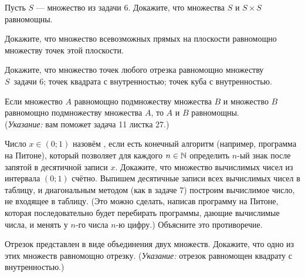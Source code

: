 \documentclass[a4paper,12pt]{article}
\begin{document}
Пусть $S$ --- множество из задачи 6. Докажите, что
множества $S$ и $S\times S$ равномощны.

Докажите, что множество всевозможных
прямых на %
плоскости
равномощно множеству точек этой плоскости.


Докажите, что множество точек любого отрезка %
равномощно множеству\\
$S$~зада\-чи 6;
%
точек квадрата с внутренностью; %
точек куба с внутренностью.



Если множество $A$ равномощно %
подмножеству множества $B$ и множество $B$ равномощно %
подмножеству множества $A$, то %
$A$ и $B$ равномощны. \\
{\footnotesize({\em Указание:} вам поможет задача 11 листка 27.)}


Число $x\in(0;1)$ назовём , если есть
конечный алгоритм (например, программа на Питоне), который позволяет для каждого $n\in\mathbb{N}$
определить $n$-ый знак после запятой в десятичной записи $x$.
 Докажите, что множество вычислимых чисел из
интервала $(0;1)$ счётно.
Выпишем десятичные записи всех вычислимых чисел
в таблицу, и диагональным методом (как в задаче 7) построим вычислимое число, не входящее в таблицу.
(Это можно сделать, написав программу на Питоне, которая последовательно будет перебирать программы, дающие вычислимые числа, и менять у $n$-го числа $n$-ю цифру.)
Объясните это противоречие.

Отрезок представлен в виде объединения двух множеств.
Докажите, что одно из этих множеств
равномощно отрезку.
{\footnotesize ({\em Указание:} отрезок равномощен квадрату с внутренностью.)}



\end{document}
